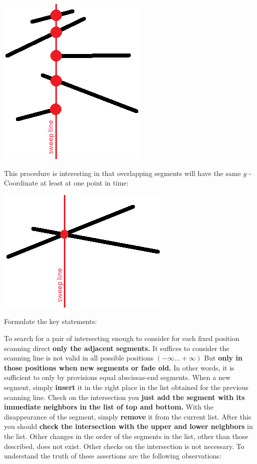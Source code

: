 \includegraphics[scale=0.5]{18.png}

This procedure is interesting in that overlapping segments will have the same $y$ -Coordinate at least at one point in time:

\includegraphics[scale=0.5]{19.png}

Formulate the key statements:

To search for a pair of intersecting enough to consider for each fixed position scanning direct \textbf{only the adjacent segments.}
It suffices to consider the scanning line is not valid in all possible positions $(- \infty \ldots + \infty)$ But \textbf{only in those positions when new segments or fade old.} In other words, it is sufficient to only by provisions equal abscissas-end segments.
When a new segment, simply \textbf{insert} it in the right place in the list obtained for the previous scanning line. Check on the intersection you \textbf{just add the segment with its immediate neighbors in the list of top and bottom.}
With the disappearance of the segment, simply \textbf{remove} it from the current list. After this you should \textbf{check the intersection with the upper and lower neighbors} in the list.
Other changes in the order of the segments in the list, other than those described, does not exist. Other checks on the intersection is not necessary.
To understand the truth of these assertions are the following observations:

